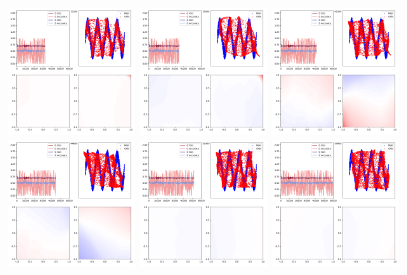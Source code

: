 \documentclass[lang=cn,11pt]{elegantpaper}
\begin{document}
\begin{figure}[hbt]
  \includegraphics[width=0.3\textwidth]{sin_4_1}
  \includegraphics[width=0.3\textwidth]{sin_4_2}
  \includegraphics[width=0.3\textwidth]{sin_4_3}\\
  \includegraphics[width=0.3\textwidth]{sin_4_4}
  \includegraphics[width=0.3\textwidth]{sin_4_5}
  \includegraphics[width=0.3\textwidth]{sin_4_6}
  \caption{}
\end{figure}
\end{document}

